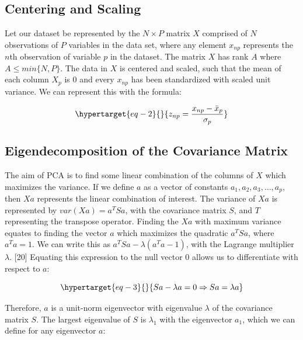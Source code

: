 \documentclass[
  letterpaper,
  DIV=11,
  numbers=noendperiod]{scrreprt}
\begin{document}
\hypertarget{centering-and-scaling}{%
\subsection{Centering and Scaling}\label{centering-and-scaling}}

Let our dataset be represented by the \(N \times P\) matrix \(X\)
comprised of \(N\) observations of \(P\) variables in the data set,
where any element \(x_{np}\) represents the \(n\)th observation of
variable \(p\) in the dataset. The matrix \(X\) has rank \(A\) where
\(A \leq min\{N, P\}\). The data in \(X\) is centered and scaled, such
that the mean of each column \(X_p\) is 0 and every \(x_{np}\) has been
standardized with scaled unit variance. We can represent this with the
formula:

\begin{equation}\protect\hypertarget{eq-2}{}{
z_{np} = \frac{x_{np} - \bar{x}_{p}}{{\sigma_{p}}}
}\label{eq-2}\end{equation}

\hypertarget{eigendecomposition-of-the-covariance-matrix}{%
\subsection{Eigendecomposition of the Covariance
Matrix}\label{eigendecomposition-of-the-covariance-matrix}}

The aim of PCA is to find some linear combination of the columns of
\(X\) which maximizes the variance. If we define \(a\) as a vector of
constants \(a_1, a_2, a_3, …, a_p\), then \(Xa\) represents the linear
combination of interest. The variance of \(Xa\) is represented by
\(var(Xa) = a^TSa\), with the covariance matrix \(S\), and \(T\)
representing the transpose operator. Finding the \(Xa\) with maximum
variance equates to finding the vector \(a\) which maximizes the
quadratic \(a^TSa\), where \(a^Ta = 1\). We can write this as
\(a^TSa - \lambda(a^Ta-1)\), with the Lagrange multiplier \(\lambda\).
{[}20{]} Equating this expression to the null vector \(0\) allows us to
differentiate with respect to \(a\):

\begin{equation}\protect\hypertarget{eq-3}{}{
Sa - \lambda a = 0 \Rightarrow Sa = \lambda a
}\label{eq-3}\end{equation}

Therefore, \(a\) is a unit-norm eigenvector with eigenvalue \(\lambda\)
of the covariance matrix \(S\). The largest eigenvalue of \(S\) is
\(\lambda_1\) with the eigenvector \(a_1\), which we can define for any
eigenvector \(a\):
\end{document}
